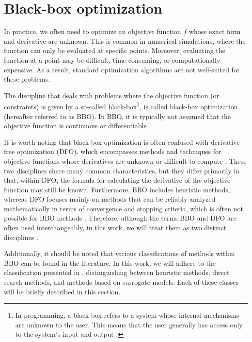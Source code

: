 \section{Black-box optimization}\label{black-box}
In practice, we often need to optimize an objective function $f$ whose exact form and derivative are unknown. This is common in numerical simulations, where the function can only be evaluated at specific points. Moreover, evaluating the function at a point may be difficult, time-consuming, or computationally expensive. As a result, standard optimization algorithms are not well-suited for these problems.

The discipline that deals with problems where the objective function (or constraints) is given by a so-called black-box\footnote{In programming, a black-box refers to a system whose internal mechanisms are unknown to the user. This means that the user generally has access only to the system’s input and output \cite{BBO-textbook}.}, is called black-box optimization (hereafter referred to as BBO). In BBO, it is typically not assumed that the objective function is continuous or differentiable \cite{BBO-textbook, derivative-free-review, two-decades}.

It is worth noting that black-box optimization is often confused with derivative-free optimization (DFO), which encompasses methods and techniques for objective functions whose derivatives are unknown or difficult to compute \cite{BBO-textbook, derivative-free-review, Kramer2011}. These two disciplines share many common characteristics, but they differ primarily in that, within DFO, the formula for calculating the derivative of the objective function may still be known. Furthermore, BBO includes heuristic methods, whereas DFO focuses mainly on methods that can be reliably analyzed mathematically in terms of convergence and stopping criteria, which is often not possible for BBO methods \cite{BBO-textbook}. Therefore, although the terms BBO and DFO are often used interchangeably, in this work, we will treat them as two distinct disciplines \cite{BBO-textbook}.

Additionally, it should be noted that various classifications of methods within BBO can be found in the literature. In this work, we will adhere to the classification presented in \cite{BBO-textbook}, distinguishing between heuristic methods, direct search methods, and methods based on surrogate models. Each of these classes will be briefly described in this section.




